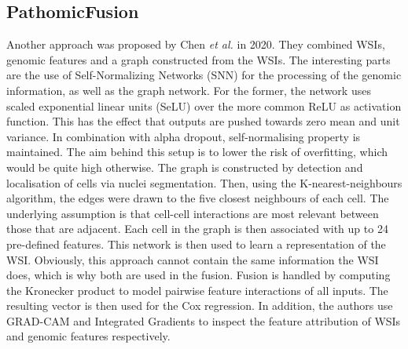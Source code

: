 \subsection{PathomicFusion} 
Another approach was proposed by Chen \textit{et al.} in 2020. They combined WSIs, genomic features and a graph constructed from the WSIs. The interesting parts are the use of Self-Normalizing Networks (SNN) for the processing of the genomic information, as well as the graph network. For the former, the network uses scaled exponential linear units (SeLU) over the more common ReLU as activation function. This has the effect that outputs are pushed towards zero mean and unit variance. In combination with alpha dropout, self-normalising property is maintained. The aim behind this setup is to lower the risk of overfitting, which would be quite high otherwise. 
The graph is constructed by detection and localisation of cells via nuclei segmentation. Then, using the K-nearest-neighbours algorithm, the edges were drawn to the five closest neighbours of each cell. The underlying assumption is that cell-cell interactions are most relevant between those that are adjacent. Each cell in the graph is then associated with up to 24 pre-defined features. This network is then used to learn a representation of the WSI. Obviously, this approach cannot contain the same information the WSI does, which is why both are used in the fusion. Fusion is handled by computing the Kronecker product to model pairwise feature interactions of all inputs. The resulting vector is then used for the Cox regression. In addition, the authors use GRAD-CAM \cite{Selvaraju2016Grad} and Integrated Gradients \cite{Sundararajan2017Axiomatic} to inspect the feature attribution of WSIs and genomic features respectively. \cite{Chen2022Pathomic}
